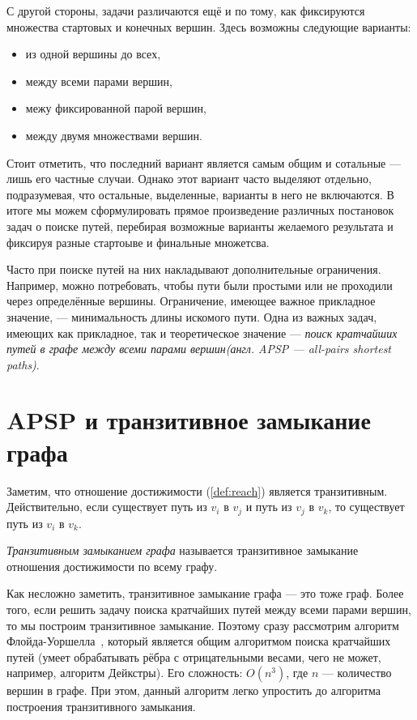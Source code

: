 С другой стороны, задачи различаются ещё и по тому, как фиксируются множества стартовых и конечных вершин.
Здесь возможны следующие варианты:
\begin{itemize}
\item из одной вершины до всех,
\item между всеми парами вершин,
\item межу фиксированной парой вершин,
\item между двумя множествами вершин.
\end{itemize}

Стоит отметить, что последний вариант является самым общим и сотальные --- лишь его частные случаи. 
Однако этот вариант часто выделяют отдельно, подразумевая, что остальные, выделенные, варианты в него не включаются. В итоге мы можем сформулировать прямое произведение различных постановок задач о поиске путей, перебирая возможные варианты желаемого результата и фиксируя разные стартоыве и финальные множетсва.

Часто при поиске путей на них накладывают дополнительные ограничения. Например, можно потребовать, чтобы пути были простыми или не проходили через определённые вершины.
Ограничение, имеющее важное прикладное значение, --- минимальность длины искомого пути.
Одна из важных задач, имеющих как прикладное, так и теоретическое значение --- \textit{поиск кратчайших путей в графе между всеми парами вершин(англ. APSP --- all-pairs shortest paths)}.



\section{APSP и транзитивное замыкание графа}

Заметим, что отношение достижимости (\ref{def:reach}) является транзитивным.
Действительно, если существует путь из $v_i$ в $v_j$ и путь из $v_j$ в $v_k$, то существует путь из $v_i$ в $v_k$.

\begin{definition}
  \textit{Транзитивным замыканием графа} называется транзитивное замыкание отношения достижимости по всему графу.
\end{definition}

Как несложно заметить, транзитивное замыкание графа --- это тоже граф.
Более того, если решить задачу поиска кратчайших путей между всеми парами вершин, то мы построим транзитивное замыкание.
Поэтому сразу рассмотрим алгоритм Флойда-Уоршелла~\cite{Floyd1962, Bernard1959, Warshall1962}, который является общим алгоритмом поиска кратчайших путей (умеет обрабатывать рёбра с отрицательными весами, чего не может, например, алгоритм Дейкстры). Его сложность: $O(n^3)$, где $n$ --- количество вершин в графе.
При этом, данный алгоритм легко упростить до алгоритма построения транзитивного замыкания.

